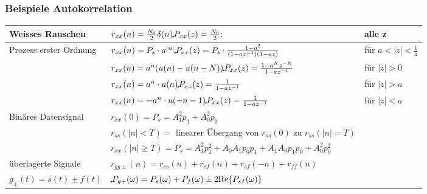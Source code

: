 \subsubsection{Beispiele Autokorrelation}
\begin{tabular}{|l|l|l|}
    \hline
        Weisses Rauschen
        & $r_{xx} (n) = \frac {N_0}{2} \delta(n) \FT P_{xx}(z)= \frac {N_0}{2};\hspace{0.25cm}$ & alle z\\
    \hline
        Prozess erster Ordnung
        & $r_{xx} (n) = P_s \cdot a^{|n|} \FT P_{xx} (z) = P_s \cdot \frac {1-a^2}{(1-az^{-1})(1-az)}$ & für $a<|z| < \frac{1}{a}$\\
    \hline
        
        & $r_{xx} (n) = a^n(u(n) - u(n-N)) \FT P_{xx} (z) = \frac{1-a^Nz^{-N}}{1-az^{-1}}$ & für $|z| > 0$\\
    \hline
        
        & $r_{xx} (n) = a^n \cdot u(n) \FT P_{xx} (z) = \frac{1}{1-az^{-1}}$ & für $|z| > a$\\
    \hline
        
        & $r_{xx} (n) = -a^n \cdot u(-n-1) \FT P_{xx} (z) = \frac{1}{1-az^{-1}}$ & für $|z| < a$\\
    \hline
        Binäres Datensignal
        & $r_{xx} (0) = P_s = A_1^2p_1 + A_0^2 p_0 $ &\\
        &$r_{ss} (|n| < T) = $ linearer Übergang von $r_{ss}(0)$ zu $r_{ss} (|n| = T)$ &\\
        & $r_{xx} (|n| \geq T) = P_s = A_1^2p_1^2 + A_0A_1p_0p_1 + A_1A_0p_1p_0 + A_0^2p_0^2$ &  \\
    \hline
        überlagerte Signale
        & $r_{gg\pm}(n) = r_{ss}(n) + r_{sf}(n) + r_{sf}(-n) + r_{ff}(n) $ &\\
        $g_\pm(t) = s(t) \pm f(t)$
        &  $\FT P_{g+}(\omega) = P_{s}(\omega) + P_{f}(\omega) \pm 2 \text{Re} \{P_{sf}(\omega) \}$ &\\ 
    \hline
\end{tabular} 
\vspace{-0.5cm}
